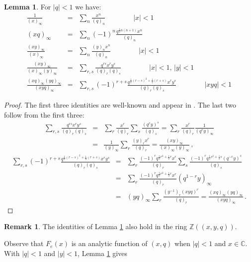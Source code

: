 \documentclass[12pt]{amsart}
\theoremstyle{definition}
\newtheorem{lemma}[theorem]{Lemma}
\newtheorem{remark}[theorem]{Remark}
\def\BZ{\mathbb Z}
\def\BC{\mathbb C}
\numberwithin{equation}{section}
\begin{document}
\begin{lemma}
\label{lem.5identities}
For $|q|<1$ we have:
\begin{eqnarray*}
\frac{1}{(x)_\infty} &=& \sum_n \frac{x^n}{(q)_n} \qquad\qquad |x|<1
\\
(xq)_\infty &=& \sum_n (-1)^n \frac{q^{\frac{1}{2}n(n+1)} x^n}{(q)_n}
\\
\frac{(xy)_\infty}{(x)_\infty} &=&  \sum_n \frac{(y)_n x^n}{(q)_n} 
\qquad\qquad |x|<1
\\
\frac{(xy)_\infty}{(x)_\infty (y)_\infty } &=&  \sum_{r,s} 
\frac{q^{r s} x^r y^s}{(q)_r(q)_s }\qquad\qquad |x|<1,\,|y|<1
\\
\frac{(xq)_\infty(yq)_\infty}{(xyq)_\infty } &=&  \sum_{r,s} 
(-1)^{r+s} \frac{q^{\frac{1}{2}(r-s)^2+\frac{1}{2}(r+s)} x^r y^s}{(q)_r(q)_s }
\qquad\qquad |xyq|<1
\end{eqnarray*}
\end{lemma}

\begin{proof}
The first three identities are well-known and appear in \cite[Prop.\ 2]{Zagier-dilog}. 
The last two follow from the first three:
\begin{eqnarray*}
\sum_{r,s} 
\frac{q^{r s} x^r y^s}{(q)_r(q)_s } &=& 
\sum_r \frac{x^{r}}{(q)_r} \sum_s 
\frac{(q^r y)^s}{(q)_s }= \sum_r \frac{x^{r}}{(q)_r} \frac{1}{(q^ry)_\infty}
\\
&=&
\frac{1}{(y)_\infty} \sum_r \frac{(y)_r x^r}{(q)_r}=
\frac{(xy)_\infty}{(x)_\infty (y)_\infty }\, ,
\end{eqnarray*}
\begin{eqnarray*}
\sum_{r,s} 
(-1)^{r+s} \frac{q^{\frac{1}{2}(r-s)^2+\frac{1}{2}(r+s)} x^r y^s}{(q)_r(q)_s }
&=&
\sum_r \frac{(-1)^r q^{\frac{1}{2}r^2+\frac{1}{2}r} x^r}{(q)_r}
\sum_s \frac{(-1)^r q^{\frac{1}{2}s^2+\frac{1}{2}s} (q^{-r}y)^s}{(q)_s} \\
&=&
\sum_r \frac{(-1)^r q^{\frac{1}{2}r^2+\frac{1}{2}r} x^r}{(q)_r} (q^{1-r}y)_\infty
\\
&=& (yq)_\infty \sum_r \frac{(y^{-1})_r (xyq)^r}{(q)_r} =
\frac{(xq)_\infty(yq)_\infty}{(xyq)_\infty } \, .
\end{eqnarray*}
\end{proof}

\begin{remark}
\label{rem.5identities}
The identities of Lemma \ref{lem.5identities} also hold in the ring
$\BZ((x,y,q))$.
\end{remark}
Observe that $F_e(x)$ is an analytic function of $(x,q)$ when
$|q|<1$ and $x \in \BC$. With $|q|<1$ and $|y|<1$, Lemma 
\ref{lem.5identities} gives
\end{document}
